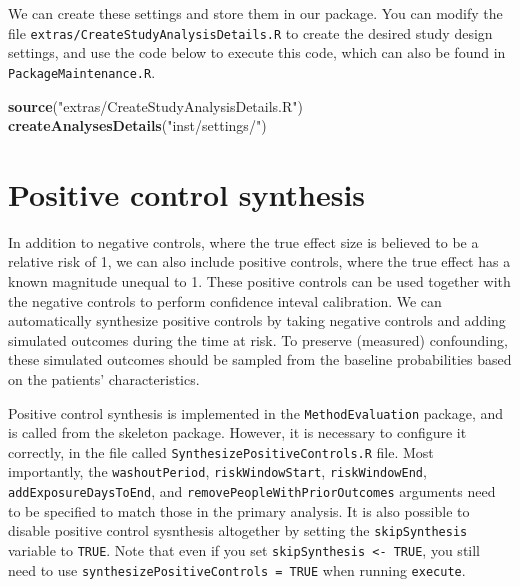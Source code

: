 \documentclass[]{article}
\newenvironment{Shaded}{\begin{snugshade}}{\end{snugshade}}
\newcommand{\KeywordTok}[1]{\textcolor[rgb]{0.13,0.29,0.53}{\textbf{#1}}}
\newcommand{\NormalTok}[1]{#1}
\newcommand{\StringTok}[1]{\textcolor[rgb]{0.31,0.60,0.02}{#1}}
\begin{document}
We can create these settings and store them in our package. You can
modify the file \texttt{extras/CreateStudyAnalysisDetails.R} to create
the desired study design settings, and use the code below to execute
this code, which can also be found in \texttt{PackageMaintenance.R}.

\begin{Shaded}
\begin{Highlighting}[]
\KeywordTok{source}\NormalTok{(}\StringTok{"extras/CreateStudyAnalysisDetails.R"}\NormalTok{)}
\KeywordTok{createAnalysesDetails}\NormalTok{(}\StringTok{"inst/settings/"}\NormalTok{)}
\end{Highlighting}
\end{Shaded}

\hypertarget{positive-control-synthesis}{%
\section{Positive control synthesis}\label{positive-control-synthesis}}

In addition to negative controls, where the true effect size is believed
to be a relative risk of 1, we can also include positive controls, where
the true effect has a known magnitude unequal to 1. These positive
controls can be used together with the negative controls to perform
confidence inteval calibration. We can automatically synthesize positive
controls by taking negative controls and adding simulated outcomes
during the time at risk. To preserve (measured) confounding, these
simulated outcomes should be sampled from the baseline probabilities
based on the patients' characteristics.

Positive control synthesis is implemented in the
\texttt{MethodEvaluation} package, and is called from the skeleton
package. However, it is necessary to configure it correctly, in the file
called \texttt{SynthesizePositiveControls.R} file. Most importantly, the
\texttt{washoutPeriod}, \texttt{riskWindowStart},
\texttt{riskWindowEnd}, \texttt{addExposureDaysToEnd}, and
\texttt{removePeopleWithPriorOutcomes} arguments need to be specified to
match those in the primary analysis. It is also possible to disable
positive control sysnthesis altogether by setting the
\texttt{skipSynthesis} variable to \texttt{TRUE}. Note that even if you
set \texttt{skipSynthesis\ \textless{}-\ TRUE}, you still need to use
\texttt{synthesizePositiveControls\ =\ TRUE} when running
\texttt{execute}.
\end{document}
